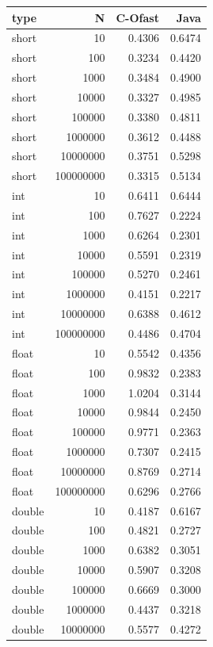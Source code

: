 \documentclass[12pt,fontset=none]{ctexart}
\newcounter{none}
\begin{document}
{\def\LTcaptype{none} %
\begin{longtable}[]{@{}lrrr@{}}
\toprule\noalign{}
type & N & C-Ofast & Java \\
\midrule\noalign{}
\endhead
\bottomrule\noalign{}
\endlastfoot
short & 10 & 0.4306 & 0.6474 \\
short & 100 & 0.3234 & 0.4420 \\
short & 1000 & 0.3484 & 0.4900 \\
short & 10000 & 0.3327 & 0.4985 \\
short & 100000 & 0.3380 & 0.4811 \\
short & 1000000 & 0.3612 & 0.4488 \\
short & 10000000 & 0.3751 & 0.5298 \\
short & 100000000 & 0.3315 & 0.5134 \\
int & 10 & 0.6411 & 0.6444 \\
int & 100 & 0.7627 & 0.2224 \\
int & 1000 & 0.6264 & 0.2301 \\
int & 10000 & 0.5591 & 0.2319 \\
int & 100000 & 0.5270 & 0.2461 \\
int & 1000000 & 0.4151 & 0.2217 \\
int & 10000000 & 0.6388 & 0.4612 \\
int & 100000000 & 0.4486 & 0.4704 \\
float & 10 & 0.5542 & 0.4356 \\
float & 100 & 0.9832 & 0.2383 \\
float & 1000 & 1.0204 & 0.3144 \\
float & 10000 & 0.9844 & 0.2450 \\
float & 100000 & 0.9771 & 0.2363 \\
float & 1000000 & 0.7307 & 0.2415 \\
float & 10000000 & 0.8769 & 0.2714 \\
float & 100000000 & 0.6296 & 0.2766 \\
double & 10 & 0.4187 & 0.6167 \\
double & 100 & 0.4821 & 0.2727 \\
double & 1000 & 0.6382 & 0.3051 \\
double & 10000 & 0.5907 & 0.3208 \\
double & 100000 & 0.6669 & 0.3000 \\
double & 1000000 & 0.4437 & 0.3218 \\
double & 10000000 & 0.5577 & 0.4272 \\

\end{longtable}}
\end{document}
